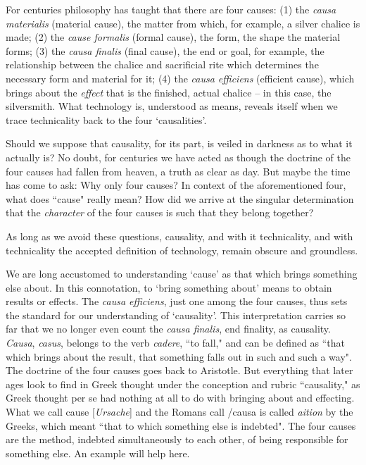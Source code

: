\documentclass[paper=a4, fontsize=11pt,twoside]{scrartcl}
\begin{document}
For centuries philosophy has taught that there are four causes: (1) the \textit{causa materialis} (material cause), the matter from which, for example, a silver chalice is made; (2) the \textit{cause formalis} (formal cause), the form, the shape the material forms; (3) the \textit{causa finalis} (final cause), the end or goal, for example, the relationship between the chalice and sacrificial rite which determines the necessary form and material for it; (4) the \textit{causa efficiens} (efficient cause), which brings about the \textit{effect} that is the finished, actual chalice -- in this case, the silversmith. What technology is, understood as means, reveals itself when we trace technicality back to the four `causalities'.

Should we suppose that causality, for its part, is veiled in darkness as to what it actually is? No doubt, for centuries we have acted as though the doctrine of the four causes had fallen from heaven, a truth as clear as day. But maybe the time has come to ask: Why only four causes? In context of the aforementioned four, what does ``cause" really mean? How did we arrive at the singular determination that the \textit{character} of the four causes is such that they belong together?

As long as we avoid these questions, causality, and with it technicality, and with technicality the accepted definition of technology, remain obscure and groundless.

We are long accustomed to understanding `cause' as that which brings something else about. In this connotation, to `bring something about' means to obtain results or effects. The \textit{causa efficiens}, just one among the four causes, thus sets the standard for our understanding of `causality'. This interpretation carries so far that we no longer even count the \textit{causa finalis}, end finality, as causality. \textit{Causa}, \textit{casus}, belongs to the verb \textit{cadere}, ``to fall," and can be defined as ``that which brings about the result, that something falls out in such and such a way". The doctrine of the four causes goes back to Aristotle. But everything that later ages look to find in Greek thought under the conception and rubric ``causality," as Greek thought per se had nothing at all to do with bringing about and effecting. What we call cause [\textit{Ursache}] and the Romans call /{causa} is called \textit{aition} by the Greeks, which meant ``that to which something else is indebted". The four causes are the method, indebted simultaneously to each other, of being responsible for something else. An example will help here.
\end{document}
